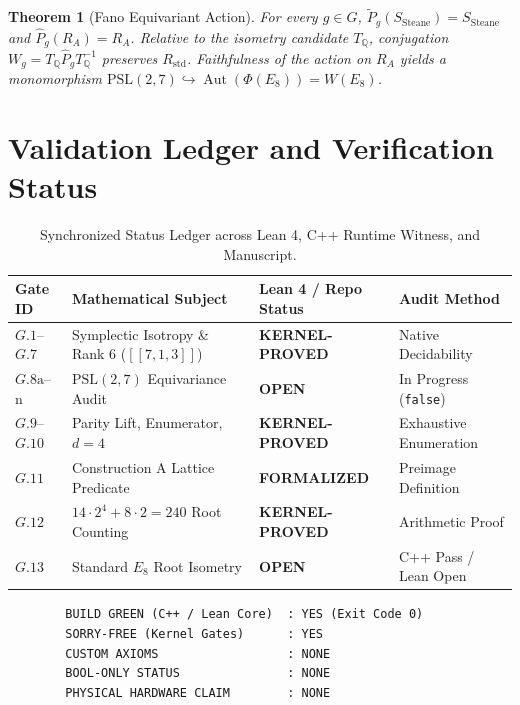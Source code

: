\documentclass[11pt,a4paper]{article}
\newtheorem{theorem}{Theorem}[section]
\theoremstyle{definition}
\begin{document}
	\begin{theorem}[Fano Equivariant Action]
		For every $g \in G$, $\widetilde{P}_g(S_{\mathrm{Steane}}) = S_{\mathrm{Steane}}$ and $\widehat{P}_g(R_A) = R_A$. Relative to the isometry candidate $T_{\mathbb{Q}}$, conjugation $W_g = T_{\mathbb{Q}} \widehat{P}_g T_{\mathbb{Q}}^{-1}$ preserves $R_{\mathrm{std}}$. Faithfulness of the action on $R_A$ yields a monomorphism $\mathrm{PSL}(2,7) \hookrightarrow \operatorname{Aut}(\Phi(E_8)) = W(E_8)$.
	\end{theorem}
	
	\section{Validation Ledger and Verification Status}
	
	\begin{table}[h]
		\centering
		\small
		\begin{tabular}{llll}
			\toprule
			\textbf{Gate ID} & \textbf{Mathematical Subject} & \textbf{Lean 4 / Repo Status} & \textbf{Audit Method} \\
			\midrule
			$G.1$--$G.7$ & Symplectic Isotropy \& Rank 6 ($[[7,1,3]]$) & \textbf{KERNEL-PROVED} & Native Decidability \\
			$G.8\mathrm{a}$--$\mathrm{n}$ & $\mathrm{PSL}(2,7)$ Equivariance Audit & \textbf{OPEN} & In Progress (\texttt{false}) \\
			$G.9$--$G.10$ & Parity Lift, Enumerator, $d=4$ & \textbf{KERNEL-PROVED} & Exhaustive Enumeration \\
			$G.11$ & Construction A Lattice Predicate & \textbf{FORMALIZED} & Preimage Definition \\
			$G.12$ & $14 \cdot 2^4 + 8 \cdot 2 = 240$ Root Counting & \textbf{KERNEL-PROVED} & Arithmetic Proof \\
			$G.13$ & Standard $E_8$ Root Isometry & \textbf{OPEN} & C++ Pass / Lean Open \\
			\bottomrule
		\end{tabular}
		\caption{Synchronized Status Ledger across Lean 4, C++ Runtime Witness, and Manuscript.}
	\end{table}
	
	\begin{verbatim}
		BUILD GREEN (C++ / Lean Core)  : YES (Exit Code 0)
		SORRY-FREE (Kernel Gates)      : YES
		CUSTOM AXIOMS                  : NONE
		BOOL-ONLY STATUS               : NONE
		PHYSICAL HARDWARE CLAIM        : NONE
	\end{verbatim}
	
\end{document}
